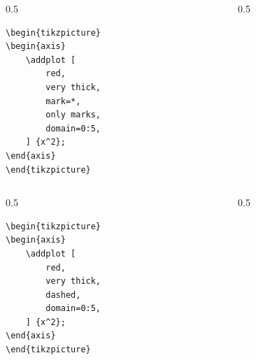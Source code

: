 \documentclass[12pt,aspectratio=169,ignorenonframetext]{ltxbeamer}
\begin{document}
\begin{frame}[fragile]
\begin{columns}
    \begin{column}{0.5\textwidth}
        \begin{verbatim}
\begin{tikzpicture}
\begin{axis}
    \addplot [
        red,
        very thick,
        mark=*,
        only marks,
        domain=0:5,
    ] {x^2};
\end{axis}
\end{tikzpicture}
        \end{verbatim}
    \end{column}
    {\color{gray} \vline}
    \begin{column}{0.5\textwidth}
    \end{column}
\end{columns}
\end{frame}




\begin{frame}[fragile]
\begin{columns}
    \begin{column}{0.5\textwidth}
        \begin{verbatim}
\begin{tikzpicture}
\begin{axis}
    \addplot [
        red,
        very thick,
        dashed,
        domain=0:5,
    ] {x^2};
\end{axis}
\end{tikzpicture}
        \end{verbatim}
    \end{column}
    {\color{gray} \vline}
    \begin{column}{0.5\textwidth}
    \end{column}
\end{columns}
\end{frame}
\end{document}
